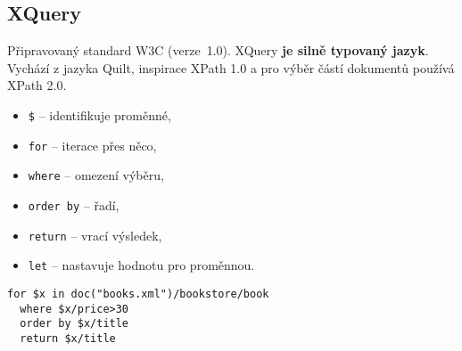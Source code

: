 \subsection{XQuery}
Připravovaný standard W3C (verze 1.0). XQuery \textbf{je silně typovaný jazyk}. Vychází z jazyka Quilt, inspirace XPath 1.0 a pro výběr částí dokumentů používá XPath 2.0.
\bigskip\\
\begin{minipage}[t]{0.5\textwidth}
  \begin{itemize}
    \item \texttt{\$} -- identifikuje proměnné,
    \item \texttt{for} -- iterace přes něco,
    \item \texttt{where} -- omezení výběru,
    \item \texttt{order by} -- řadí,
    \item \texttt{return} -- vrací výsledek,
    \item \texttt{let} -- nastavuje hodnotu pro proměnnou.
  \end{itemize}
\end{minipage}
\begin{minipage}[t]{0.5\textwidth}
  \begin{verbatim}
for $x in doc("books.xml")/bookstore/book
  where $x/price>30
  order by $x/title
  return $x/title
  \end{verbatim}
\end{minipage}
